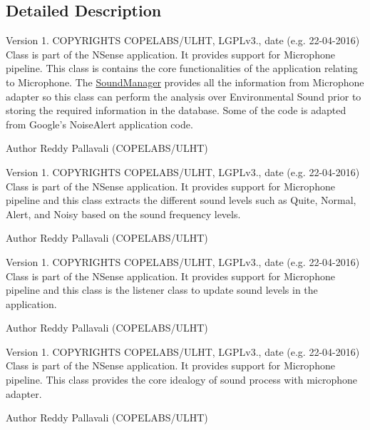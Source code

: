 \subsection{Detailed Description}
\begin{DoxyVersion}{Version}
1. C\-O\-P\-Y\-R\-I\-G\-H\-T\-S C\-O\-P\-E\-L\-A\-B\-S/\-U\-L\-H\-T, L\-G\-P\-Lv3., date (e.\-g. 22-\/04-\/2016) Class is part of the N\-Sense application. It provides support for Microphone pipeline. This class is contains the core functionalities of the application relating to Microphone. The \hyperlink{classcs_1_1nsense_1_1microphone_1_1_sound_manager}{Sound\-Manager} provides all the information from Microphone adapter so this class can perform the analysis over Environmental Sound prior to storing the required information in the database. Some of the code is adapted from Google's Noise\-Alert application code. 
\end{DoxyVersion}
\begin{DoxyAuthor}{Author}
Reddy Pallavali (C\-O\-P\-E\-L\-A\-B\-S/\-U\-L\-H\-T)
\end{DoxyAuthor}
\begin{DoxyVersion}{Version}
1. C\-O\-P\-Y\-R\-I\-G\-H\-T\-S C\-O\-P\-E\-L\-A\-B\-S/\-U\-L\-H\-T, L\-G\-P\-Lv3., date (e.\-g. 22-\/04-\/2016) Class is part of the N\-Sense application. It provides support for Microphone pipeline and this class extracts the different sound levels such as Quite, Normal, Alert, and Noisy based on the sound frequency levels. 
\end{DoxyVersion}
\begin{DoxyAuthor}{Author}
Reddy Pallavali (C\-O\-P\-E\-L\-A\-B\-S/\-U\-L\-H\-T)
\end{DoxyAuthor}
\begin{DoxyVersion}{Version}
1. C\-O\-P\-Y\-R\-I\-G\-H\-T\-S C\-O\-P\-E\-L\-A\-B\-S/\-U\-L\-H\-T, L\-G\-P\-Lv3., date (e.\-g. 22-\/04-\/2016) Class is part of the N\-Sense application. It provides support for Microphone pipeline and this class is the listener class to update sound levels in the application. 
\end{DoxyVersion}
\begin{DoxyAuthor}{Author}
Reddy Pallavali (C\-O\-P\-E\-L\-A\-B\-S/\-U\-L\-H\-T)
\end{DoxyAuthor}
\begin{DoxyVersion}{Version}
1. C\-O\-P\-Y\-R\-I\-G\-H\-T\-S C\-O\-P\-E\-L\-A\-B\-S/\-U\-L\-H\-T, L\-G\-P\-Lv3., date (e.\-g. 22-\/04-\/2016) Class is part of the N\-Sense application. It provides support for Microphone pipeline. This class provides the core idealogy of sound process with microphone adapter. 
\end{DoxyVersion}
\begin{DoxyAuthor}{Author}
Reddy Pallavali (C\-O\-P\-E\-L\-A\-B\-S/\-U\-L\-H\-T) 
\end{DoxyAuthor}
